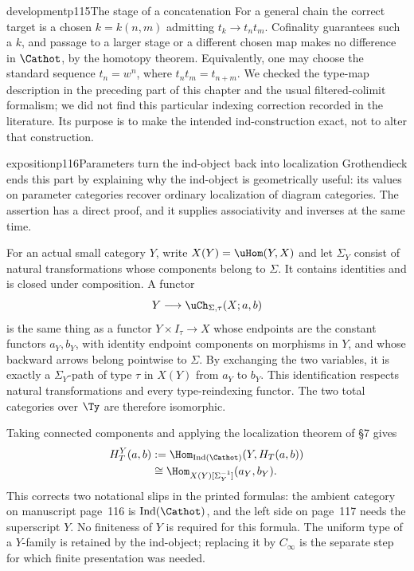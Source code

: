 \begin{dcomment}{development}{p115}{The stage of a concatenation}
For a general chain the correct target is a chosen $k=k(n,m)$ admitting $t_k\to t_nt_m$. Cofinality guarantees such a $k$, and passage to a larger stage or a different chosen map makes no difference in $\Cathot$, by the homotopy theorem. Equivalently, one may choose the standard sequence $t_n=w^n$, where $t_nt_m=t_{n+m}$. We checked the type-map description in the preceding part of this chapter and the usual filtered-colimit formalism; we did not find this particular indexing correction recorded in the literature. Its purpose is to make the intended ind-construction exact, not to alter that construction.
\end{dcomment}

\begin{dcomment}{exposition}{p116}{Parameters turn the ind-object back into localization}
Grothendieck ends this part by explaining why the ind-object is geometrically useful: its values on parameter categories recover ordinary localization of diagram categories. The assertion has a direct proof, and it supplies associativity and inverses at the same time.

For an actual small category $Y$, write $X(Y)=\uHom(Y,X)$ and let $\Sigma_Y$ consist of natural transformations whose components belong to $\Sigma$. It contains identities and is closed under composition. A functor
\[
 Y\longrightarrow\uCh_{\Sigma,\tau}(X;a,b)
\]
is the same thing as a functor $Y\times I_\tau\to X$ whose endpoints are the constant functors $a_Y,b_Y$, with identity endpoint components on morphisms in $Y$, and whose backward arrows belong pointwise to $\Sigma$. By exchanging the two variables, it is exactly a $\Sigma_Y$-path of type $\tau$ in $X(Y)$ from $a_Y$ to $b_Y$. This identification respects natural transformations and every type-reindexing functor. The two total categories over $\Ty$ are therefore isomorphic.

Taking connected components and applying the localization theorem of \S7 gives
\[
 \begin{split}
 H_T^Y(a,b)
 &:=\Hom_{\operatorname{Ind}(\Cathot)}(Y,H_T(a,b))\\
 &\cong\Hom_{X(Y)[\Sigma_Y^{-1}]}(a_Y,b_Y).
 \end{split}
\]
This corrects two notational slips in the printed formulas: the ambient category on manuscript page~116 is $\operatorname{Ind}(\Cathot)$, and the left side on page~117 needs the superscript $Y$. No finiteness of $Y$ is required for this formula. The uniform type of a $Y$-family is retained by the ind-object; replacing it by $C_\infty$ is the separate step for which finite presentation was needed.


\end{dcomment}
